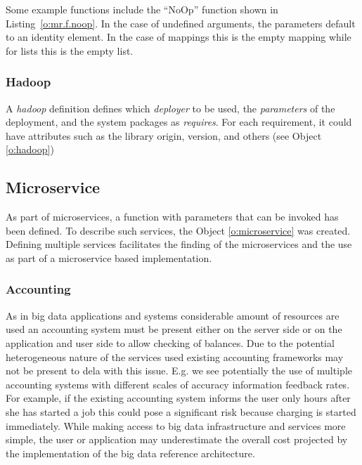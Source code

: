 \documentclass[10pt]{article}
\begin{document}


Some example functions include the ``NoOp'' function shown in
Listing~\ref{o:mr.f.noop}.  In the case of undefined arguments,
the parameters default to an identity element. In the case of mappings
this is the empty mapping while for lists this is the empty list.



\subsubsection{Hadoop}

A \textit{hadoop} definition defines which \textit{deployer} to be used,
the \textit{parameters} of the deployment, and the system packages as
\textit{requires}. For each requirement, it could have attributes such
as the library origin, version, and others (see Object \ref{o:hadoop})



\subsection{Microservice}

As part of microservices, a function with parameters that can be invoked
has been defined. To describe such services, the Object \ref {o:microservice}
was created. Defining multiple services facilitates the finding of the
microservices and the use as part of a microservice based implementation.
 



 
\subsubsection{Accounting}


As in big data applications and systems considerable amount of
resources are used an accounting system must be present either on the
server side or on the application and user side to allow checking of
balances. Due to the potential heterogeneous nature of the services
used existing accounting frameworks may not be present to dela with
this issue. E.g. we see potentially the use of multiple accounting
systems with different scales of accuracy information feedback
rates. For example, if the existing accounting system informs the user
only hours after she has started a job this could pose a significant
risk because charging is started immediately. While making access to
big data infrastructure and services more simple, the user or
application may underestimate the overall cost projected by the
implementation of the big data reference architecture.
\end{document}
